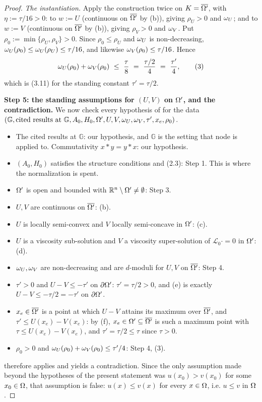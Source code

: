 \begin{proof}
\emph{The instantiation.} Apply the construction twice on $K=\overline{\Omega'}$, with
$\eta:=\tau/16>0$: to $w:=U$ (continuous on $\overline{\Omega'}$ by (b)), giving $\rho_U>0$ and
$\omega_U$; and to $w:=V$ (continuous on $\overline{\Omega'}$ by (b)), giving $\rho_V>0$ and
$\omega_V$. Put $\rho_0:=\min\{\rho_U,\rho_V\}>0$. Since $\rho_0\le\rho_U$ and $\omega_U$ is
non-decreasing, $\omega_U(\rho_0)\le\omega_U(\rho_U)\le\tau/16$, and likewise
$\omega_V(\rho_0)\le\tau/16$. Hence
\[
 \om_U(\rho_0)+\om_V(\rho_0)\ \le\ \frac\tau8\ =\ \frac{\tau/2}4\ =\ \frac{\tau'}4 ,
 \tag{3}
\]
which is (3.11) for the standing constant $\tau'=\tau/2$.

\medskip\noindent\textbf{Step 5: the standing assumptions for $(U,V)$ on $\Omega'$, and the
contradiction.} We now check every hypothesis of  for the
data
$(\mathbb G,\text{cited results at }\mathbb G,A_0,H_0,\Omega',U,V,\omega_U,\omega_V,\tau',x_e,\rho_0)$.
\begin{itemize}
\item The cited results at $\mathbb G$: our hypothesis, and $\mathbb G$ is the setting that
  node is applied to. Commutativity $x*y=y*x$: our hypothesis.
\item $(A_0,H_0)$ satisfies the structure conditions and (2.3): Step 1. This is where the
  normalization is spent.
\item $\Omega'$ is open and bounded with $\mathbb R^{n}\setminus\Omega'\ne\emptyset$: Step 3.
\item $U,V$ are continuous on $\overline{\Omega'}$: (b).
\item $U$ is locally semi-convex and $V$ locally semi-concave in $\Omega'$: (c).
\item $U$ is a viscosity sub-solution and $V$ a viscosity super-solution of
  $\mathcal L_0\cdot=0$ in $\Omega'$: (d).
\item $\omega_U,\omega_V$ are non-decreasing and are $d$-moduli for $U,V$ on $\overline{\Omega'}$:
  Step 4.
\item $\tau'>0$ and $U-V\le-\tau'$ on $\partial\Omega'$: $\tau'=\tau/2>0$, and (e) is exactly
  $U-V\le-\tau/2=-\tau'$ on $\partial\Omega'$.
\item $x_e\in\overline{\Omega'}$ is a point at which $U-V$ attains its maximum over
  $\overline{\Omega'}$, and $\tau'\le U(x_e)-V(x_e)$: by (f), $x_e\in\Omega'\subseteq\overline{\Omega'}$
  is such a maximum point with $\tau\le U(x_e)-V(x_e)$, and $\tau'=\tau/2\le\tau$ since
  $\tau>0$.
\item $\rho_0>0$ and $\omega_U(\rho_0)+\omega_V(\rho_0)\le\tau'/4$: Step 4, (3).
\end{itemize}
 therefore applies and yields a contradiction. Since the only
assumption made beyond the hypotheses of the present statement was $u(x_0)>v(x_0)$ for some
$x_0\in\Omega$, that assumption is false: $u(x)\le v(x)$ for every $x\in\Omega$, i.e. $u\le v$ in
$\Omega$.
\end{proof}
